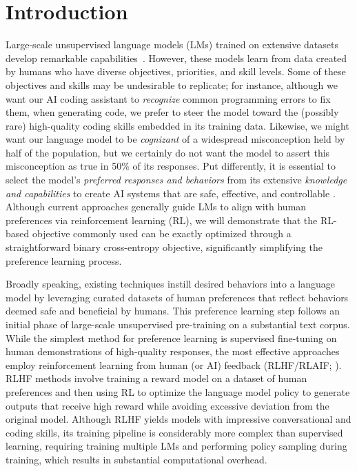 \section{Introduction}
Large-scale unsupervised language models (LMs) trained on extensive datasets develop remarkable capabilities~\citep{chowdhery2022palm, brown2020language, touvron2023llama,bubeck2023sparks}. However, these models learn from data created by humans who have diverse objectives, priorities, and skill levels. Some of these objectives and skills may be undesirable to replicate; for instance, although we want our AI coding assistant to \textit{recognize} common programming errors to fix them, when generating code, we prefer to steer the model toward the (possibly rare) high-quality coding skills embedded in its training data. Likewise, we might want our language model to be \textit{cognizant} of a widespread misconception held by half of the population, but we certainly do not want the model to assert this misconception as true in 50\% of its responses. Put differently, it is essential to select the model's \emph{preferred responses and behaviors} from its extensive \textit{knowledge and capabilities} to create AI systems that are safe, effective, and controllable \citep{ouyang2022training}. Although current approaches generally guide LMs to align with human preferences via reinforcement learning (RL), we will demonstrate that the RL-based objective commonly used can be exactly optimized through a straightforward binary cross-entropy objective, significantly simplifying the preference learning process.

Broadly speaking, existing techniques instill desired behaviors into a language model by leveraging curated datasets of human preferences that reflect behaviors deemed safe and beneficial by humans. This preference learning step follows an initial phase of large-scale unsupervised pre-training on a substantial text corpus. While the simplest method for preference learning is supervised fine-tuning on human demonstrations of high-quality responses, the most effective approaches employ reinforcement learning from human (or AI) feedback (RLHF/RLAIF; \citep{christiano2017deep,bai2022constitutional}). RLHF methods involve training a reward model on a dataset of human preferences and then using RL to optimize the language model policy to generate outputs that receive high reward while avoiding excessive deviation from the original model. Although RLHF yields models with impressive conversational and coding skills, its training pipeline is considerably more complex than supervised learning, requiring training multiple LMs and performing policy sampling during training, which results in substantial computational overhead.

